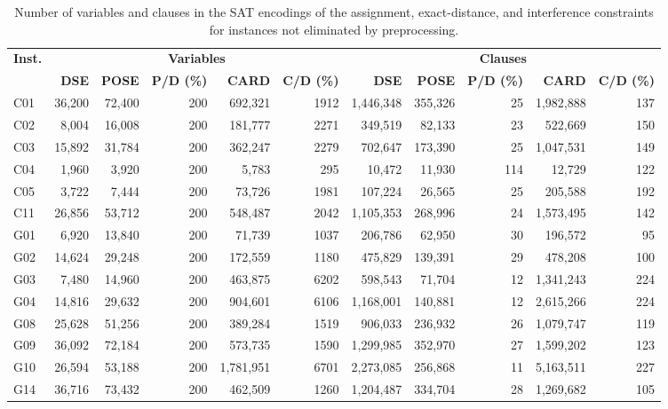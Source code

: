 \begin{table}[!htbp]
\centering
\caption{Number of variables and clauses in the SAT encodings of the assignment, exact-distance, and interference constraints for instances not eliminated by preprocessing.}
\label{tab:hard_encoding_full}
\tiny
\setlength{\tabcolsep}{2.5pt}
\renewcommand{\arraystretch}{1.0}
\begin{tabular}{@{}lrrrrrrrrrr@{}}
\toprule
\multirow{2}{*}{\textbf{Inst.}} & \multicolumn{5}{c}{\textbf{Variables}} & \multicolumn{5}{c}{\textbf{Clauses}} \\
\cmidrule(lr){2-6}\cmidrule(lr){7-11}
& \textbf{DSE} & \textbf{POSE} & \textbf{P/D (\%)} & \textbf{CARD} & \textbf{C/D (\%)} & \textbf{DSE} & \textbf{POSE} & \textbf{P/D (\%)} & \textbf{CARD} & \textbf{C/D (\%)} \\
\midrule
C01 & 36,200 & 72,400 & 200 & 692,321 & 1912 & 1,446,348 & 355,326 & 25 & 1,982,888 & 137 \\
C02 & 8,004 & 16,008 & 200 & 181,777 & 2271 & 349,519 & 82,133 & 23 & 522,669 & 150 \\
C03 & 15,892 & 31,784 & 200 & 362,247 & 2279 & 702,647 & 173,390 & 25 & 1,047,531 & 149 \\
C04 & 1,960 & 3,920 & 200 & 5,783 & 295 & 10,472 & 11,930 & 114 & 12,729 & 122 \\
C05 & 3,722 & 7,444 & 200 & 73,726 & 1981 & 107,224 & 26,565 & 25 & 205,588 & 192 \\
C11 & 26,856 & 53,712 & 200 & 548,487 & 2042 & 1,105,353 & 268,996 & 24 & 1,573,495 & 142 \\
G01 & 6,920 & 13,840 & 200 & 71,739 & 1037 & 206,786 & 62,950 & 30 & 196,572 & 95 \\
G02 & 14,624 & 29,248 & 200 & 172,559 & 1180 & 475,829 & 139,391 & 29 & 478,208 & 100 \\
G03 & 7,480 & 14,960 & 200 & 463,875 & 6202 & 598,543 & 71,704 & 12 & 1,341,243 & 224 \\
G04 & 14,816 & 29,632 & 200 & 904,601 & 6106 & 1,168,001 & 140,881 & 12 & 2,615,266 & 224 \\
G08 & 25,628 & 51,256 & 200 & 389,284 & 1519 & 906,033 & 236,932 & 26 & 1,079,747 & 119 \\
G09 & 36,092 & 72,184 & 200 & 573,735 & 1590 & 1,299,985 & 352,970 & 27 & 1,599,202 & 123 \\
G10 & 26,594 & 53,188 & 200 & 1,781,951 & 6701 & 2,273,085 & 256,868 & 11 & 5,163,511 & 227 \\
G14 & 36,716 & 73,432 & 200 & 462,509 & 1260 & 1,204,487 & 334,704 & 28 & 1,269,682 & 105 \\

\end{tabular}
\end{table}
